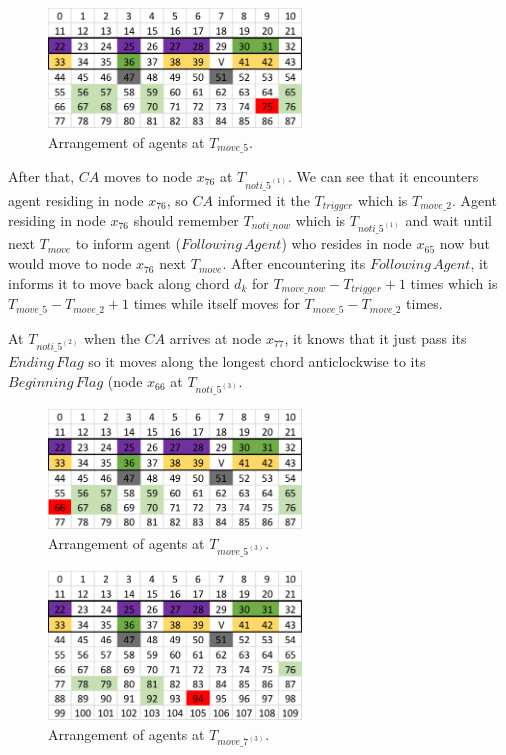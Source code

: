 \begin{figure}[H]
  \centering  
  \includegraphics[width=0.6\textwidth]{figures/T75.png}
  \caption{Arrangement of agents at $T_{move\_5}$. }\label{fig:T75}
\end{figure}
After that, $CA$ moves to node $x_{76}$ at $T_{noti\_5^{(1)}}$. We can see that it encounters agent residing in node $x_{76}$, so $CA$ informed it the $T_{trigger}$ which is $T_{move\_2}$. Agent residing in node $x_{76}$ should remember $T_{noti\_now}$ which is $T_{noti\_5^{(1)}}$ and wait until next $T_{move}$ to inform agent ($Following\,Agent$) who resides in node $x_{65}$ now but would move to node $x_{76}$ next $T_{move}$. After encountering its $Following\,Agent$, it informs it to move back along chord $d_k$ for $T_{move\_now}-T_{trigger} +1$ times which is $T_{move\_5}- T_{move\_2}+1$ times while itself moves for $T_{move\_5}-T_{move\_2}$ times. 

At $T_{noti\_5^{(2)}}$ when the $CA$ arrives at node $x_{77}$, it knows that it just pass its $Ending\,Flag$ so it moves along the longest chord anticlockwise to its $Beginning\,Flag$ (node $x_{66}$ at $T_{noti\_5^{(3)}}$.
\begin{figure}[H]
  \centering  
  \includegraphics[width=0.6\textwidth]{figures/T66.png}
  \caption{Arrangement of agents at $T_{move\_5^{(3)}}$. }\label{fig:T66}
\end{figure}

\begin{figure}[H]
  \centering  
  \includegraphics[width=0.6\textwidth]{figures/T94.png}
  \caption{Arrangement of agents at $T_{move\_7^{(3)}}$. }\label{fig:T94}
\end{figure}


